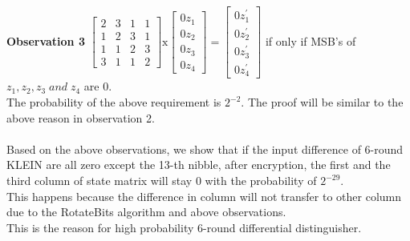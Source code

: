 \documentclass[preprint]{transcrypto}
\begin{document}
\\ \\
\textbf{Observation 3}
\begin{math}
\begin{bmatrix}
2&3&1&1\\
1&2&3&1\\
1&1&2&3\\
3&1&1&2
\end{bmatrix}
\text{x}
\begin{bmatrix}
0z_{1} \\
0z_{2} \\
0z_{3} \\
0z_{4} 
\end{bmatrix} = 
\begin{bmatrix}
0z^{'}_{1} \\
0z^{'}_{2} \\
0z^{'}_{3} \\
0z^{'}_{4} 
\end{bmatrix}
\end{math}
 if only if MSB's of $z_{1},
z_{2} ,
z_{3} \;and\;
z_{4} $ are 0.\\
The probability of the above requirement is $2^{-2}$. The proof will be similar to the above reason in observation 2.\\
\\Based on the above observations, we show that if the input difference of 6-round KLEIN are all zero except the 13-th nibble, after encryption, the first and the third column of state matrix will
stay 0 with the probability of $2^{-29}$.\\
This happens because the difference in column will not transfer to other column due to the RotateBits algorithm and above observations. \\ This is the reason for high probability 6-round differential distinguisher.
\end{document}
